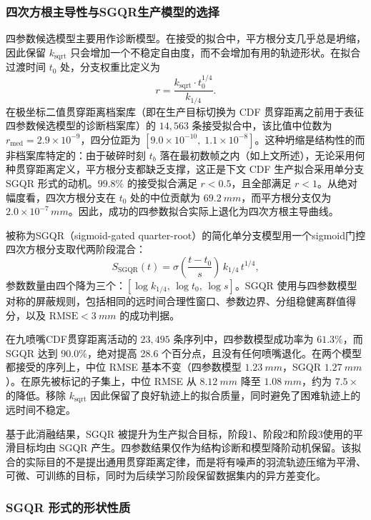\subsubsection{四次方根主导性与SGQR生产模型的选择}

四参数候选模型主要用作诊断模型。在接受的拟合中，平方根分支几乎总是坍缩，因此保留 \(k_{\mathrm{sqrt}}\) 只会增加一个不稳定自由度，而不会增加有用的轨迹形状。在拟合过渡时间 \(t_0\) 处，分支权重比定义为
\[
r = \frac{k_{\mathrm{sqrt}}\cdot t_0^{1/4}}{k_{1/4}}.
\]
在极坐标二值贯穿距离档案库（即在生产目标切换为 CDF 贯穿距离之前用于表征四参数候选模型的诊断档案库）的 \(14{,}563\) 条接受拟合中，该比值中位数为 \(r_{\mathrm{med}}=2.9\times10^{-9}\)，四分位距为 \([9.0\times10^{-10},\;1.1\times10^{-8}]\)。这种坍缩是结构性的而非档案库特定的：由于破碎时刻 \(t_b\) 落在最初数帧之内（如上文所述），无论采用何种贯穿距离定义，平方根分支都缺乏支撑，这正是下文 CDF 生产拟合采用单分支 SGQR 形式的动机。\(99.8\%\) 的接受拟合满足 \(r<0.5\)，且全部满足 \(r<1\)。从绝对幅度看，四次方根分支在 \(t_0\) 处的中位贡献为 \(\SI{69.2}{mm}\)，而平方根分支仅为 \(2.0\times10^{-7}\,\si{mm}\)。因此，成功的四参数拟合实际上退化为四次方根主导曲线。

被称为SGQR（sigmoid-gated quarter-root）的简化单分支模型用一个sigmoid门控四次方根分支取代两阶段混合：
\[
S_{\mathrm{SGQR}}(t) = \sigma\!\left(\frac{t-t_0}{s}\right)\,k_{1/4}\,t^{1/4},
\]
参数数量由四个降为三个：\([\log k_{1/4},\,\log t_0,\,\log s]\)。SGQR 使用与四参数模型对称的屏蔽规则，包括相同的远时间合理性窗口、参数边界、分组稳健离群值得分，以及 \(\mathrm{RMSE}<\SI{3}{mm}\) 的成功判据。

在九喷嘴CDF贯穿距离活动的 \(23{,}495\) 条序列中，四参数模型成功率为 \(61.3\%\)，而 SGQR 达到 \(90.0\%\)，绝对提高 28.6 个百分点，且没有任何喷嘴退化。在两个模型都接受的序列上，中位 RMSE 基本不变（四参数模型 \(\SI{1.23}{mm}\)，SGQR \(\SI{1.27}{mm}\)）。在原先被标记的子集上，中位 RMSE 从 \(\SI{8.12}{mm}\) 降至 \(\SI{1.08}{mm}\)，约为 \(7.5\times\) 的降低。移除 \(k_{\mathrm{sqrt}}\) 因此保留了良好轨迹上的拟合质量，同时避免了困难轨迹上的远时间不稳定。

基于此消融结果，SGQR 被提升为生产拟合目标，阶段1、阶段2和阶段3使用的平滑目标均由 SGQR 产生。四参数结果仅作为结构诊断和模型降阶动机保留。该拟合的实际目的不是提出通用贯穿距离定律，而是将有噪声的羽流轨迹压缩为平滑、可微、可训练的目标，同时为后续学习阶段保留数据集内的异方差变化。

\subsubsection{SGQR 形式的形状性质}
\label{sec:SGQR-shape-properties-en}

